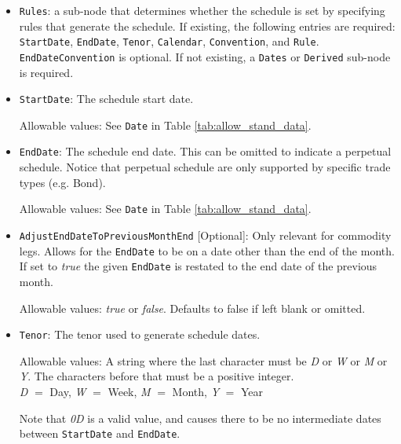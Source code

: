 \begin{itemize}
\item \lstinline!Rules!: a sub-node that determines whether the schedule is set by specifying rules that
generate the schedule. If existing, the following entries are required: \lstinline!StartDate!, \lstinline!EndDate!, \lstinline!Tenor!, \lstinline!Calendar!, 
\lstinline!Convention!, and \lstinline!Rule!. \lstinline!EndDateConvention! is optional. If not existing, a \lstinline!Dates! or \lstinline!Derived!
sub-node is required.
\item \lstinline!StartDate!:  The schedule start date.  

Allowable values:  See \lstinline!Date! in Table \ref{tab:allow_stand_data}.

\item \lstinline!EndDate!: The schedule end date. This can be omitted to indicate a perpetual schedule. Notice that perpetual
  schedule are only supported by specific trade types (e.g. Bond).

Allowable values:  See \lstinline!Date! in Table \ref{tab:allow_stand_data}.

\item \lstinline!AdjustEndDateToPreviousMonthEnd! [Optional]: Only relevant for commodity legs. Allows for the \lstinline!EndDate! to be on a date other than the end of the month. If set to \emph{true} the given \lstinline!EndDate! is restated to the end date of the previous month.

Allowable values: \emph{true} or \emph{false}. Defaults to false if left blank or omitted.

\item \lstinline!Tenor!: The tenor used to generate schedule dates. 

Allowable values: A string where the last character must be \emph{D} or \emph{W} or
\emph{M} or \emph{Y}.  The characters before that must be a positive integer. \\ \emph{D}
$=$ Day, \emph{W} $=$ Week, \emph{M} $=$ Month, \emph{Y} $=$ Year

Note that \emph{0D} is a valid value, and causes there to be no intermediate dates between \lstinline!StartDate! and \lstinline!EndDate!.


\end{itemize}
